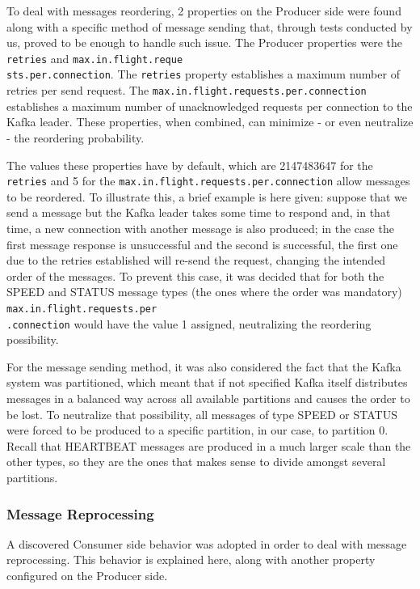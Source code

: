 \documentclass[12pt]{article}
\begin{document}
To deal with messages reordering, 2 properties on the Producer side were found along with a specific method of message sending that, through tests conducted by 
us, proved to be enough to handle such issue.
The Producer properties were the \texttt{retries} and \texttt{max.in.flight.reque\\sts.per.connection}.
The \texttt{retries} property establishes a maximum number of retries per send request.
The \texttt{max.in.flight.requests.per.connection} establishes a maximum number of unacknowledged requests per connection to the Kafka leader. 
These properties, when combined, can minimize - or even neutralize - the reordering probability. 

The values these properties have by default, which are 2147483647 for the \texttt{retries} and 5 for the \texttt{max.in.flight.requests.per.connection} allow 
messages to be reordered.
To illustrate this, a brief example is here given:
suppose that we send a message but the Kafka leader takes some time to respond and, in that time, a new connection with another message is also produced; 
in the case the first message response is unsuccessful and the second is successful, the first one due to the retries established will re-send the request, 
changing the intended order of the messages. 
To prevent this case, it was decided that for both the SPEED and STATUS message types (the ones where the order was mandatory) 
\texttt{max.in.flight.requests.per\\.connection} would have the value 1 assigned, neutralizing the reordering possibility.

For the message sending method, it was also considered the fact that the Kafka system was partitioned, which meant that if not specified Kafka itself distributes 
messages in a balanced way across all available partitions and causes the order to be lost. 
To neutralize that possibility, all messages of type SPEED or STATUS were forced to be produced to a specific partition, in our case, to partition 0.
Recall that HEARTBEAT messages are produced in a much larger scale than the other types, so they are the ones that makes sense to divide amongst several partitions.

\subsubsection{Message Reprocessing}\label{reprocessing}

A discovered Consumer side behavior was adopted in order to deal with message reprocessing.
This behavior is explained here, along with another property configured on the Producer side.
\end{document}
